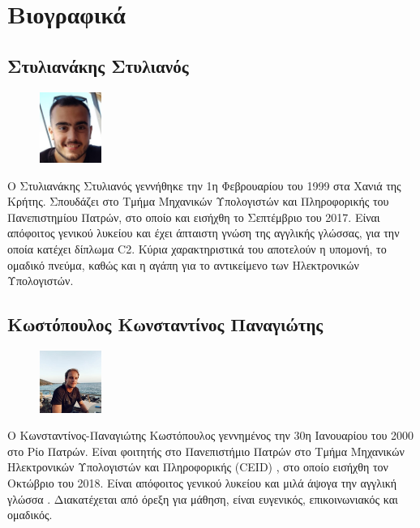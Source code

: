 \documentclass{article}
\newcommand{\en}{\selectlanguage{english}}
\newcommand{\gr}{\selectlanguage{greek}}
\begin{document}
\section{Βιογραφικά}
\subsection*{Στυλιανάκης Στυλιανός}
\begin{figure}
	\includegraphics[width=2cm]{Stylianakis.jpg}
\end{figure} 
Ο Στυλιανάκης Στυλιανός γεννήθηκε την 1η Φεβρουαρίου του 1999 στα Χανιά της Κρήτης. Σπουδάζει στο Τμήμα Μηχανικών Υπολογιστών και Πληροφορικής του Πανεπιστημίου Πατρών, στο οποίο και εισήχθη το Σεπτέμβριο του 2017. Είναι απόφοιτος γενικού λυκείου και έχει άπταιστη γνώση της αγγλικής γλώσσας, για την οποία κατέχει δίπλωμα C2. Κύρια χαρακτηριστικά του αποτελούν η υπομονή, το ομαδικό πνεύμα, καθώς και η αγάπη για το αντικείμενο των Ηλεκτρονικών Υπολογιστών. 

\subsection*{Κωστόπουλος Κωνσταντίνος Παναγιώτης}
\begin{figure}
	\includegraphics[width=2cm]{Kostopoulos.jpg}
\end{figure} 
Ο Κωνσταντίνος-Παναγιώτης Κωστόπουλος γεννημένος την 30η Ιανουαρίου του 2000 στο Ρίο Πατρών. Είναι φοιτητής στο Πανεπιστήμιο Πατρών στο Τμήμα Μηχανικών Ηλεκτρονικών Υπολογιστών και Πληροφορικής \en(CEID) \gr, στο οποίο εισήχθη τον Οκτώβριο του 2018. Είναι απόφοιτος γενικού λυκείου και μιλά άψογα την αγγλική γλώσσα . Διακατέχεται από όρεξη για μάθηση, είναι ευγενικός, επικοινωνιακός και ομαδικός.
\end{document}
